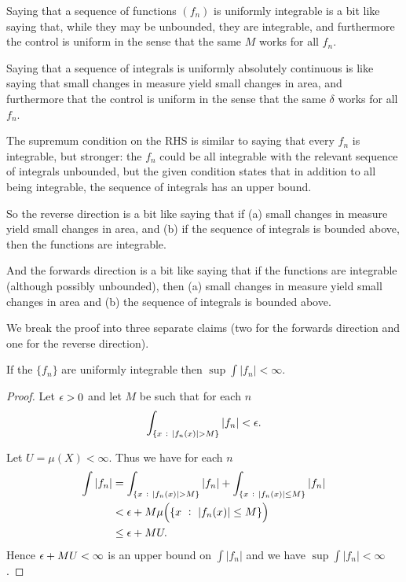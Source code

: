 \begin{intuition*}
  Saying that a sequence of functions $(f_n)$ is uniformly integrable is a bit like saying that, while they may
  be unbounded, they are integrable, and furthermore the control is uniform in the sense that the same $M$
  works for all $f_n$.

  Saying that a sequence of integrals is uniformly absolutely continuous is like saying that small changes in
  measure yield small changes in area, and furthermore that the control is uniform in the sense that the
  same $\delta$ works for all $f_n$.

  The supremum condition on the RHS is similar to saying that every $f_n$ is integrable, but stronger:
  the $f_n$ could be all integrable with the relevant sequence of integrals unbounded, but the given condition
  states that in addition to all being integrable, the sequence of integrals has an upper bound.

  So the reverse direction is a bit like saying that if (a) small changes in measure yield small changes in
  area, and (b) if the sequence of integrals is bounded above, then the functions are integrable.

  And the forwards direction is a bit like saying that if the functions are integrable (although possibly
  unbounded), then (a) small changes in measure yield small changes in area and (b) the sequence of integrals
  is bounded above.
\end{intuition*}

We break the proof into three separate claims (two for the forwards direction and one for the reverse direction).

\begin{claim*}
  If the $\{f_n\}$ are uniformly integrable then $\sup \int |f_n| < \infty$.
\end{claim*}

\begin{proof}
  Let $\epsilon > 0$ and let $M$ be such that for each $n$
  \begin{align*}
    \int_{\{x ~:~ |f_n(x)| > M\}} |f_n| < \epsilon.
  \end{align*}

  Let $U = \mu(X) < \infty$. Thus we have for each $n$
  \begin{align*}
    \int |f_n|
    &= \int_{\{x ~:~ |f_n(x)| > M\}} |f_n| + \int_{\{x ~:~ |f_n(x)| \leq M\}} |f_n| \\
    &< \epsilon +  M \mu\Big(\{x ~:~ |f_n(x)| \leq M\}\Big) \\
    &\leq \epsilon + MU.
  \end{align*}
  Hence $\epsilon + MU < \infty$ is an upper bound on $\int |f_n|$ and we have $\sup \int |f_n| < \infty$.
\end{proof}

